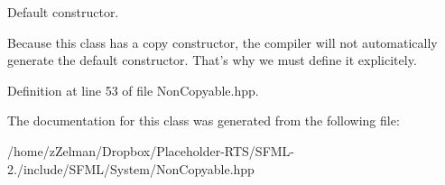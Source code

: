 Default constructor. 

Because this class has a copy constructor, the compiler will not automatically generate the default constructor. That's why we must define it explicitely. 

Definition at line 53 of file Non\-Copyable.\-hpp.



The documentation for this class was generated from the following file\-:\begin{DoxyCompactItemize}
\item 
/home/z\-Zelman/\-Dropbox/\-Placeholder-\/\-R\-T\-S/\-S\-F\-M\-L-\/2./include/\-S\-F\-M\-L/\-System/Non\-Copyable.\-hpp\end{DoxyCompactItemize}
